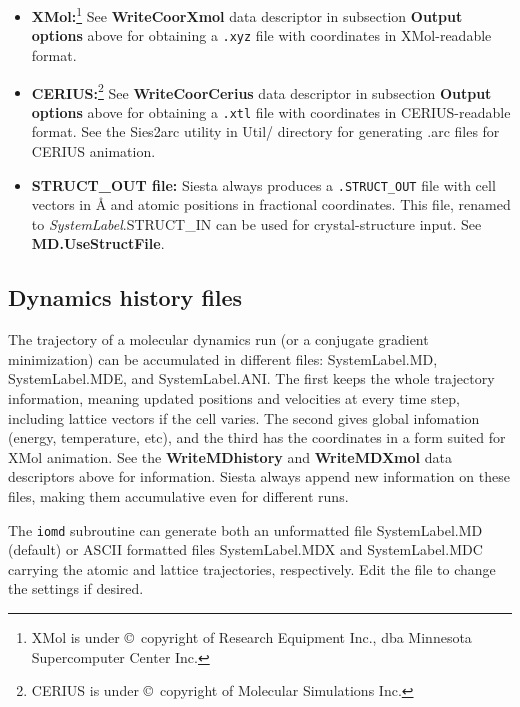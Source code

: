 \documentclass[11pt]{article}
\begin{document}
\begin{itemize}
\item{\bf XMol:}\footnote[1]{XMol is under \copyright\ copyright of Research 
Equipment Inc., dba Minnesota Supercomputer Center Inc.}
See {\bf WriteCoorXmol} data descriptor in subsection {\bf Output options}
above for obtaining a {\tt .xyz} file with coordinates in 
XMol-readable format.

\item{\bf CERIUS:}\footnote[2]{CERIUS is under \copyright\ copyright of 
Molecular Simulations Inc.}
See {\bf WriteCoorCerius} data descriptor in subsection {\bf Output options}
above for obtaining a {\tt .xtl} file with coordinates in 
CERIUS-readable format. See the {\sc Sies2arc}
utility in Util/ directory
for generating .arc files for CERIUS animation.

\item{\bf STRUCT\_OUT file:}
Siesta always produces a {\tt .STRUCT\_OUT} file with cell vectors in {\AA}
and atomic positions in fractional coordinates. This file, renamed to
{\it SystemLabel}.STRUCT\_IN can be used for crystal-structure input.
See {\bf MD.UseStructFile}.


\end{itemize}


\subsection{Dynamics history files}
The trajectory of a molecular dynamics run (or a conjugate gradient
minimization) can be accumulated in different files: SystemLabel.MD,
SystemLabel.MDE, and SystemLabel.ANI. The first keeps the whole trajectory
information, meaning updated positions and velocities at every time step, 
including lattice vectors if the cell varies.
The second gives global infomation (energy, temperature, etc),
and the third has the coordinates in a form suited for XMol animation.
See the {\bf WriteMDhistory} and {\bf WriteMDXmol} data descriptors 
above for information. {\sc Siesta} always append new information on these
files, making them accumulative even for different runs.

The {\tt iomd} subroutine can generate both
an unformatted file SystemLabel.MD (default) or  ASCII formatted files
SystemLabel.MDX and SystemLabel.MDC carrying the atomic and lattice
trajectories, respectively. Edit the file to change the settings if desired.
\end{document}
